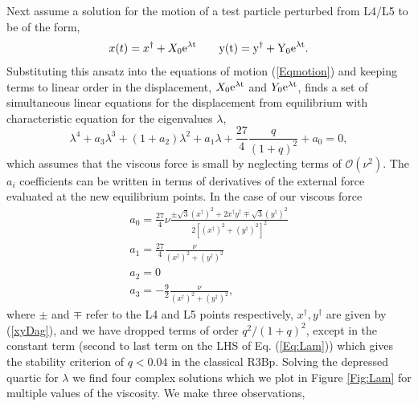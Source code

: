 \documentclass[usenatbib]{mnras}
\begin{document}
Next assume a solution for the motion of a test particle perturbed
from L4/L5 to be of the form,
\begin{equation}
\label{ansatz}
x(t) = x^{\dagger} + X_0 \rm{e}^{\lambda t} \qquad y(t) = y^{\dagger} + Y_0 \rm{e}^{\lambda t}.
\end{equation}
Substituting this ansatz into the equations of motion (\ref{Eqmotion})
and keeping terms to linear order in the displacement,
$X_0\rm{e}^{\lambda t}$ and $Y_0\rm{e}^{\lambda t}$,
\cite{Murray:1994} finds a set of simultaneous linear equations for
the displacement from equilibrium with characteristic equation for the
eigenvalues $\lambda$,
\begin{equation}
\lambda^4 + a_3 \lambda^3  + (1+a_2)\lambda^2 + a_1 \lambda + \frac{27}{4}\frac{q}{(1+q)^2} + a_0 = 0,
\label{Eq:Lam}
\end{equation}
which assumes that the viscous force is small by neglecting terms of
$\mathcal{O}(\nu^2)$.  The $a_i$ coefficients can be written in terms
of derivatives of the external force evaluated at the new equilibrium
points. In the case of our viscous force
\begin{equation}
\begin{array}{l}
a_0 =  \frac{27}{4}\nu\frac{ \pm \sqrt{3} (x^{\dagger})^2 + 2 x^{\dagger} y^{\dagger} \mp \sqrt{3} (y^{\dagger})^2 }{2  \left[(x^{\dagger})^2  +   (y^{\dagger})^2\right]^2}   \nonumber \\
%
a_1 =  \frac{27}{4}\frac{\nu }{ (x^{\dagger})^2  +    (y^{\dagger})^2}  \nonumber \\
%
a_2 = 0   \nonumber \\
%
a_3 =  - \frac{9}{2}\frac{\nu }{ (x^{\dagger})^2  +    (y^{\dagger})^2},
\end{array}
\end{equation}
where $\pm$ and $\mp$ refer to the L4 and L5 points respectively,
$x^{\dagger}, y^{\dagger}$ are given by (\ref{xyDag}), and we have
dropped terms of order $q^2/(1+q)^2$, except in the constant term
(second to last term on the LHS of Eq. (\ref{Eq:Lam})) which gives the
stability criterion of $q<0.04$ in the classical R3Bp. Solving the
depressed quartic for $\lambda$ we find four complex solutions
which we plot in Figure \ref{Fig:Lam} for multiple values of the
viscosity. We make three observations, 
\end{document}
